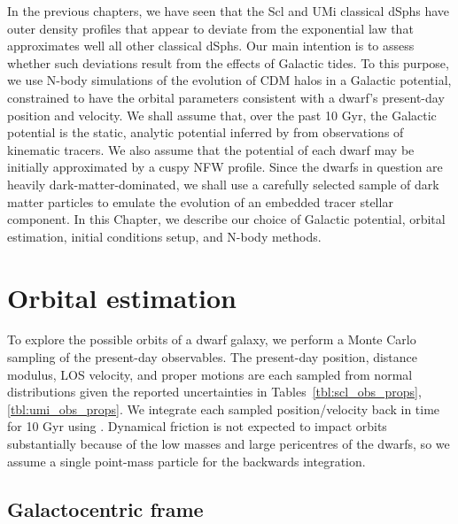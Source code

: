 In the previous chapters, we have seen that the Scl and UMi classical
dSphs have outer density profiles that appear to deviate from the
exponential law that approximates well all other classical dSphs. Our
main intention is to assess whether such deviations result from the
effects of Galactic tides. To this purpose, we use N-body simulations of
the evolution of CDM halos in a Galactic potential, constrained to have
the orbital parameters consistent with a dwarf's present-day position
and velocity. We shall assume that, over the past 10 Gyr, the Galactic
potential is the static, analytic potential inferred by
\citet{mcmillan2011} from observations of kinematic tracers. We also
assume that the potential of each dwarf may be initially approximated by
a cuspy NFW profile. Since the dwarfs in question are heavily
dark-matter-dominated, we shall use a carefully selected sample of dark
matter particles to emulate the evolution of an embedded tracer stellar
component. In this Chapter, we describe our choice of Galactic
potential, orbital estimation, initial conditions setup, and N-body
methods.

\section{Orbital estimation}\label{sec:orbital_estimation}

To explore the possible orbits of a dwarf galaxy, we perform a Monte
Carlo sampling of the present-day observables. The present-day position,
distance modulus, LOS velocity, and proper motions are each sampled from
normal distributions given the reported uncertainties in
Tables~\ref{tbl:scl_obs_props}, \ref{tbl:umi_obs_props}. We integrate
each sampled position/velocity back in time for 10 Gyr using \agama{}
\citep{agama}. Dynamical friction is not expected to impact orbits
substantially because of the low masses and large pericentres of the
dwarfs, so we assume a single point-mass particle for the backwards
integration.

\subsection{Galactocentric frame}\label{galactocentric-frame}

